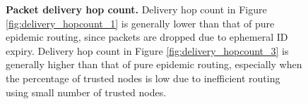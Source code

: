 \documentclass[11pt]{article}
\begin{document}
\begin{figure}[h!]
\center
{}
\hfill
{}
\caption{{\bf Packet delivery hop count.}
Delivery hop count in Figure \ref{fig:delivery_hopcount_1} is generally lower than that of pure epidemic routing, since packets are dropped due to ephemeral ID expiry.  
Delivery hop count in Figure \ref{fig:delivery_hopcount_3} is generally higher than that of pure epidemic routing, especially when the percentage of trusted nodes is low due to inefficient routing using small number of trusted nodes.
}
\label{fig:delivery_hopcount}
\end{figure}
\end{document}
